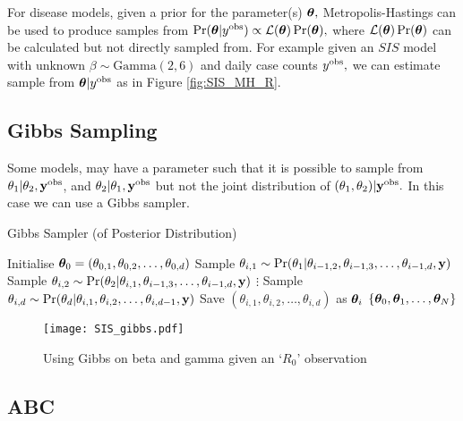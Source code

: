 For disease models, given a prior for the parameter(s) $\bm{\theta},$
Metropolis-Hastings can be used to produce samples from
$\Pr(\bm{\theta} | y^{\mathrm{obs}}) \propto \mathcal{L}(\bm{\theta})\Pr(\bm{\theta}),$ where
$\mathcal{L}(\bm{\theta})\Pr(\bm{\theta})$ can be calculated but not directly
sampled from. For example given an $SIS$ model with unknown
$\beta \sim \mathrm{Gamma}(2, 6)$ and daily case counts $y^{\mathrm{obs}},$ we can
estimate sample from $\bm{\theta} | y^{\mathrm{obs}}$ as in Figure \ref{fig:SIS_MH_R}.

\subsection*{Gibbs Sampling}

Some models, may have a parameter such that it is possible
to sample from $\theta_1 | \theta_2, \mathbf{y}^{\mathrm{obs}}$, and
$\theta_2 | \theta_1, \mathbf{y}^{\mathrm{obs}}$ but not the joint distribution of
$(\theta_1, \theta_2)| \mathbf{y}^{\mathrm{obs}}.$
In this case we can use a Gibbs sampler.

\begin{algorithm}[htbp]
    \caption{Gibbs Sampler (of Posterior Distribution)}
    \label{alg:gibbs}
    \begin{algorithmic}[1]
        \State Initialise
        $\bm{\theta}_0 = (\theta_{0,1}, \theta_{0,2}, \dots, \theta_{0,d})$
        \State Sample
        $\theta_{i, 1}
            \sim \Pr(
            \theta_1
            | \theta_{i-1, 2}, \theta_{i-1, 3}, \dots, \theta_{i-1, d}, \mathbf{y}
            )$
        \State Sample
        $\theta_{i, 2}
            \sim \Pr(
                \theta_2
                | \theta_{i, 1}, \theta_{i - 1, 3}, \dots, \theta_{i-1, d}, \mathbf{y})$
        \State $\vdots$
        \State Sample
        $\theta_{i, d}
            \sim \Pr(
                \theta_d
                | \theta_{i, 1}, \theta_{i, 2}, \dots, \theta_{i, d-1}, \mathbf{y})$
        \State Save $(\theta_{i, 1}, \theta_{i, 2}, \dots, \theta_{i, d})$ 
        as $\bm{\theta}_i$
        \EndFor
        \State \Return $\{\bm{\theta}_0, \bm{\theta}_1, \dots, \bm{\theta}_N\}$
    \end{algorithmic}
\end{algorithm}

\begin{figure}[htbp]
    \centering
    \texttt{[image: SIS\_gibbs.pdf]}
    \caption{Using Gibbs on beta and gamma given an `$R_0$' observation}
    \label{fig:gibbs_R}
\end{figure}

\subsection*{ABC}